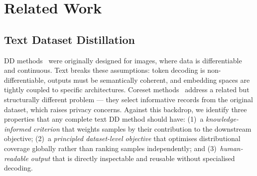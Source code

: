 \section{Related Work} \label{sec:52-research03-related}

\subsection{Text Dataset Distillation} \label{ch5:sec:02-related-textdd}

\begin{foldable} %
    DD methods~\cite{wang2018dataset,zhao2020dataset,cazenavette2022dataset,kim2022dataset,wang2022cafe} were originally designed for images, where data is differentiable and continuous.
    Text breaks these assumptions: token decoding is non-differentiable, outputs must be semantically coherent, and embedding spaces are tightly coupled to specific architectures.
    Coreset methods~\cite{welling2009herding,sener2018active} address a related but structurally different problem --- they select informative records from the original dataset, which raises privacy concerns.
    Against this backdrop, we identify three properties that any complete text DD method should have: (1)~a \emph{knowledge-informed criterion} that weights samples by their contribution to the downstream objective; (2)~a \emph{principled dataset-level objective} that optimises distributional coverage globally rather than ranking samples independently; and (3)~\emph{human-readable output} that is directly inspectable and reusable without specialised decoding.
\end{foldable}


